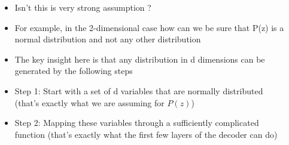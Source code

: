\documentclass[serif,aspectratio=169,dvipsnames]{beamer}
\begin{document}
\begin{frame}
\begin{columns}
\begin{overlayarea}{\textwidth}{\textheight}
		\end{overlayarea}
		\begin{overlayarea}{\textwidth}{\textheight}
			\begin{itemize}\justifying
				\item<1-> Isn't this is very strong assumption ?
				\item<2-> For example, in the 2-dimensional case how can we be sure that P(z) is a normal distribution and not any other distribution
				\item<3-> The key insight here is that any distribution in d dimensions can be generated by the following steps
				\item<4-> Step 1: Start with a set of d variables that are normally distributed (that's exactly what we are assuming for $P(z)$)
				\item<5-> Step 2: Mapping these variables through a sufficiently complicated function (that's exactly what the first few layers of the decoder can do)
			\end{itemize}
		\end{overlayarea}
	\end{columns}
\end{frame}
\end{document}
